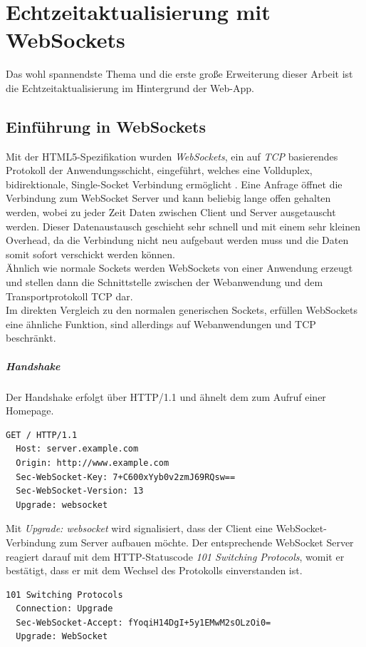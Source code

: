\chapter{Echtzeitaktualisierung mit WebSockets}
Das wohl spannendste Thema und die erste große Erweiterung dieser Arbeit ist die Echtzeitaktualisierung im Hintergrund der Web-App.

\section{Einführung in WebSockets}
Mit der HTML5-Spezifikation wurden \emph{WebSockets}, ein auf \emph{TCP} basierendes Protokoll der Anwendungsschicht, eingeführt, welches eine Vollduplex, bidirektionale, Single-Socket Verbindung ermöglicht \cite[S. 7]{ws}. Eine Anfrage öffnet die Verbindung zum WebSocket Server und kann beliebig lange offen gehalten werden, wobei zu jeder Zeit Daten zwischen Client und Server ausgetauscht werden. Dieser Datenaustausch geschieht sehr schnell und mit einem sehr kleinen Overhead, da die Verbindung nicht neu aufgebaut werden muss und die Daten somit sofort verschickt werden können.\\
Ähnlich wie \glqq normale\grqq{} Sockets werden WebSockets von einer Anwendung erzeugt und stellen dann die Schnittstelle zwischen der Webanwendung und dem Transportprotokoll TCP dar.\\
Im direkten Vergleich zu den normalen generischen Sockets, erfüllen WebSockets eine ähnliche Funktion, sind allerdings auf Webanwendungen und TCP beschränkt. 

\paragraph{Handshake} 
Der Handshake erfolgt über HTTP/1.1 und ähnelt dem zum Aufruf einer Homepage.
\\
\begin{lstlisting}[captionpos=b, caption=HTTP Request des Clients {\cite[S. 6]{rfc6455:handshake}}]
  GET / HTTP/1.1
  Host: server.example.com
  Origin: http://www.example.com
  Sec-WebSocket-Key: 7+C600xYyb0v2zmJ69RQsw==
  Sec-WebSocket-Version: 13
  Upgrade: websocket
\end{lstlisting}

Mit \emph{Upgrade: websocket} wird signalisiert, dass der Client eine WebSocket-Verbindung zum Server aufbauen möchte. Der entsprechende WebSocket Server reagiert darauf mit dem HTTP-Statuscode \emph{101 Switching Protocols}, womit er bestätigt, dass er mit dem Wechsel des Protokolls einverstanden ist.
\\
\begin{lstlisting}[captionpos=b, caption=HTTP Response des Servers {\cite[S. 8]{rfc6455:handshake}}]
  101 Switching Protocols
  Connection: Upgrade
  Sec-WebSocket-Accept: fYoqiH14DgI+5y1EMwM2sOLzOi0=
  Upgrade: WebSocket
\end{lstlisting}


